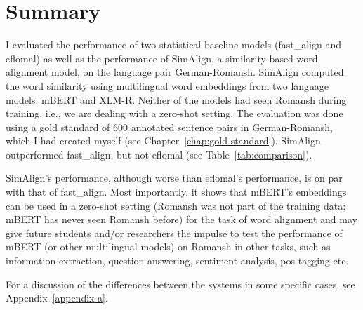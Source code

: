  
\section{Summary}
I evaluated the performance of  two statistical baseline models (fast\_align and eflomal)  as well as the performance of SimAlign, a similarity-based word alignment model, on the language pair German-Romansh. 
SimAlign computed the word similarity using multilingual word embeddings from two language models: mBERT and XLM-R. Neither of the models had seen Romansh during training, i.e., we are dealing with a zero-shot setting.
The evaluation was done using a gold standard of 600 annotated sentence pairs in German-Romansh, which I had created myself (see Chapter~\ref{chap:gold-standard}).
SimAlign outperformed fast\_align, but not eflomal (see Table~\ref{tab:comparison}). 

SimAlign's performance, although worse than eflomal's performance, is on par with that of fast\_align. 
Most importantly, it shows that mBERT's embeddings can be used in a zero-shot setting (Romansh was not part of the training data; mBERT has never seen Romansh before) for the task of word alignment and may give future students and/or researchers the impulse to test the performance of mBERT (or other multilingual models) on Romansh in other tasks, such as information extraction, question answering, sentiment analysis, \acrshort{pos} tagging etc.

For a discussion of the differences between the systems in some specific cases, see Appendix~\ref{appendix-a}.



